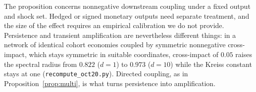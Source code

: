The proposition concerns nonnegative downstream coupling under a fixed output and shock set. Hedged or signed monetary outputs need separate treatment, and the size of the effect requires an empirical calibration we do not provide. Persistence and transient amplification are nevertheless different things: in a network of identical cohort economies coupled by symmetric nonnegative cross-impact, which stays symmetric in suitable coordinates, cross-impact of $0.05$ raises the spectral radius from $0.822$ ($d=1$) to $0.973$ ($d=10$) while the Kreiss constant stays at one (\texttt{recompute\_oct20.py}). Directed coupling, as in Proposition~\ref{prop:multi}, is what turns persistence into amplification.
